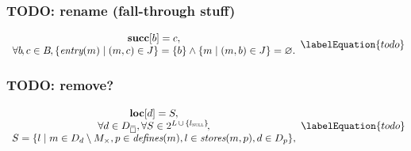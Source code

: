 \subsubsection{TODO: rename (fall-through stuff)}



\begin{equation}
  \begin{array}{c}
    \mVar{succ}[b] = c, \\
    \forall b \hspace{-1pt}, c \in \mBlockSet \hspace{-1pt},
    \mSetBuilder{\mEntry(m)}{\mPair{m}{c} \in \mFallThroughSet} = \mSet{b}
    \mAnd
    \mSetBuilder{m}{\mPair{m}{b} \in \mFallThroughSet} = \mEmptySet.
  \end{array}
  \labelEquation{todo}
\end{equation}



\subsubsection{TODO: remove?}


\begin{equation}
  \begin{array}{c}
    \mVar{loc}[d] = S, \\
    \forall d \in \mStateDataCompSet,
    \forall S \in
      \mPowerset{\mLocationSet \, \cup \, \mSet{\mNullLocation}} \!, \\
    S = \mSetBuilder{l}%
                    {%
                      m \in \mDataSet[d] \setminus \mKillMatchSet,
                      p \in \mDefines(m),
                      l \in \mStores(m, p),
                      d \in \mDataSet[p]
                    },
  \end{array}
  \labelEquation{todo}
\end{equation}



